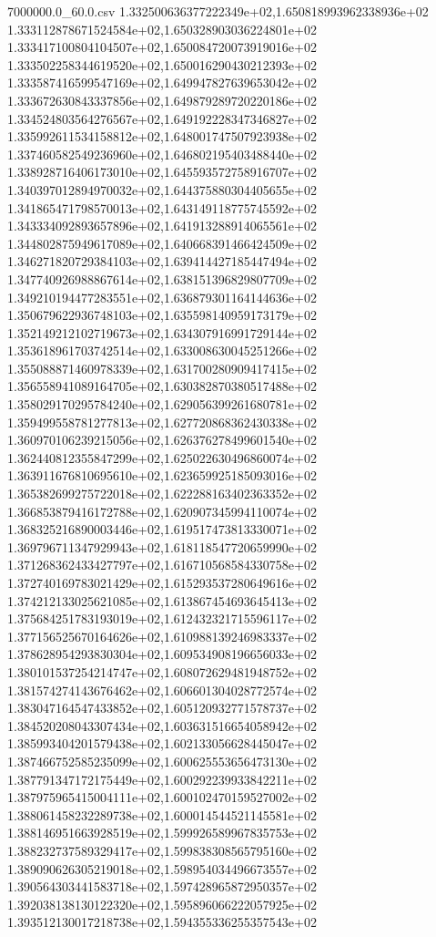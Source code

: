 \begin{filecontents*}{7000000.0_60.0.csv}
1.332500636377222349e+02,1.650818993962338936e+02
1.333112878671524584e+02,1.650328903036224801e+02
1.333417100804104507e+02,1.650084720073919016e+02
1.333502258344619520e+02,1.650016290430212393e+02
1.333587416599547169e+02,1.649947827639653042e+02
1.333672630843337856e+02,1.649879289720220186e+02
1.334524803564276567e+02,1.649192228347346827e+02
1.335992611534158812e+02,1.648001747507923938e+02
1.337460582549236960e+02,1.646802195403488440e+02
1.338928716406173010e+02,1.645593572758916707e+02
1.340397012894970032e+02,1.644375880304405655e+02
1.341865471798570013e+02,1.643149118775745592e+02
1.343334092893657896e+02,1.641913288914065561e+02
1.344802875949617089e+02,1.640668391466424509e+02
1.346271820729384103e+02,1.639414427185447494e+02
1.347740926988867614e+02,1.638151396829807709e+02
1.349210194477283551e+02,1.636879301164144636e+02
1.350679622936748103e+02,1.635598140959173179e+02
1.352149212102719673e+02,1.634307916991729144e+02
1.353618961703742514e+02,1.633008630045251266e+02
1.355088871460978339e+02,1.631700280909417415e+02
1.356558941089164705e+02,1.630382870380517488e+02
1.358029170295784240e+02,1.629056399261680781e+02
1.359499558781277813e+02,1.627720868362430338e+02
1.360970106239215056e+02,1.626376278499601540e+02
1.362440812355847299e+02,1.625022630496860074e+02
1.363911676810695610e+02,1.623659925185093016e+02
1.365382699275722018e+02,1.622288163402363352e+02
1.366853879416172788e+02,1.620907345994110074e+02
1.368325216890003446e+02,1.619517473813330071e+02
1.369796711347929943e+02,1.618118547720659990e+02
1.371268362433427797e+02,1.616710568584330758e+02
1.372740169783021429e+02,1.615293537280649616e+02
1.374212133025621085e+02,1.613867454693645413e+02
1.375684251783193019e+02,1.612432321715596117e+02
1.377156525670164626e+02,1.610988139246983337e+02
1.378628954293830304e+02,1.609534908196656033e+02
1.380101537254214747e+02,1.608072629481948752e+02
1.381574274143676462e+02,1.606601304028772574e+02
1.383047164547433852e+02,1.605120932771578737e+02
1.384520208043307434e+02,1.603631516654058942e+02
1.385993404201579438e+02,1.602133056628445047e+02
1.387466752585235099e+02,1.600625553656473130e+02
1.387791347172175449e+02,1.600292239933842211e+02
1.387975965415004111e+02,1.600102470159527002e+02
1.388061458232289738e+02,1.600014544521145581e+02
1.388146951663928519e+02,1.599926589967835753e+02
1.388232737589329417e+02,1.599838308565795160e+02
1.389090626305219018e+02,1.598954034496673557e+02
1.390564303441583718e+02,1.597428965872950357e+02
1.392038138130122320e+02,1.595896066222057925e+02
1.393512130017218738e+02,1.594355336255357543e+02

\end{filecontents*}
